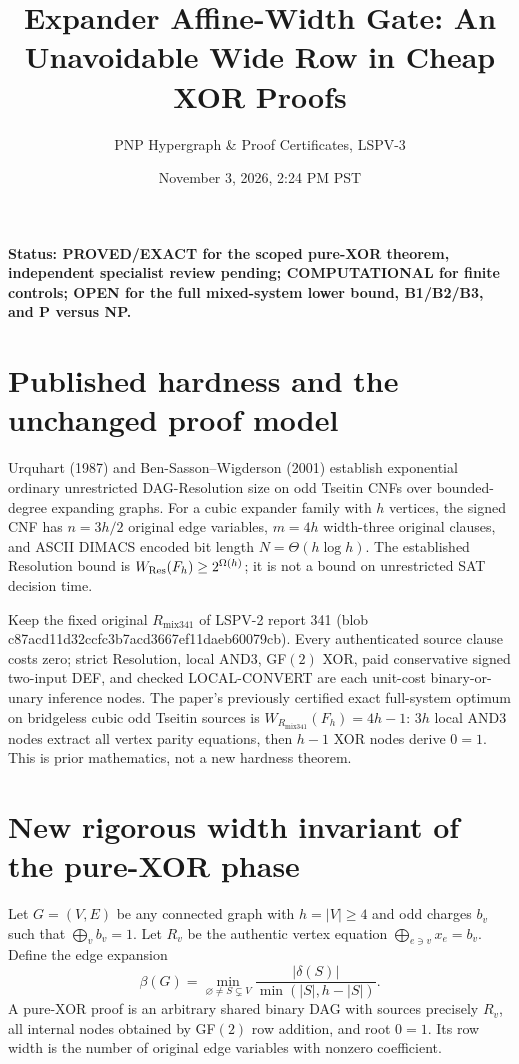 \documentclass[11pt]{article}
\title{Expander Affine-Width Gate: An Unavoidable Wide Row in Cheap XOR Proofs}
\author{PNP Hypergraph \& Proof Certificates, LSPV-3}
\date{November 3, 2026, 2:24 PM PST}
\begin{document}
\maketitle
\noindent\textbf{Status: PROVED/EXACT for the scoped pure-XOR theorem, independent specialist review pending; COMPUTATIONAL for finite controls; OPEN for the full mixed-system lower bound, B1/B2/B3, and P versus NP.}

\section*{Published hardness and the unchanged proof model}
Urquhart (1987) and Ben-Sasson--Wigderson (2001) establish exponential ordinary unrestricted DAG-Resolution size on odd Tseitin CNFs over bounded-degree expanding graphs. For a cubic expander family with $h$ vertices, the signed CNF has $n=3h/2$ original edge variables, $m=4h$ width-three original clauses, and ASCII DIMACS encoded bit length $N=\Theta(h\log h)$. The established Resolution bound is $W_{\rm Res}(F_h)\ge 2^{\Omega(h)}$; it is not a bound on unrestricted SAT decision time.

Keep the fixed original $R_{\mathrm{mix341}}$ of LSPV-2 report 341 (blob c87acd11d32ccfc3b7acd3667ef11daeb60079cb). Every authenticated source clause costs zero; strict Resolution, local AND3, GF$(2)$ XOR, paid conservative signed two-input DEF, and checked LOCAL-CONVERT are each unit-cost binary-or-unary inference nodes. The paper's previously certified exact full-system optimum on bridgeless cubic odd Tseitin sources is $W_{R_{\mathrm{mix341}}}(F_h)=4h-1$: $3h$ local AND3 nodes extract all vertex parity equations, then $h-1$ XOR nodes derive $0=1$. This is prior mathematics, not a new hardness theorem.

\section*{New rigorous width invariant of the pure-XOR phase}
Let $G=(V,E)$ be any connected graph with $h=|V|\ge4$ and odd charges $b_v$ such that $\bigoplus_v b_v=1$. Let $R_v$ be the authentic vertex equation $\bigoplus_{e\ni v}x_e=b_v$. Define the edge expansion
\[
\beta(G)=\min_{\varnothing\ne S\subsetneq V}
\frac{|\delta(S)|}{\min(|S|,h-|S|)} .
\]
A pure-XOR proof is an arbitrary shared binary DAG with sources precisely $R_v$, all internal nodes obtained by GF$(2)$ row addition, and root $0=1$. Its row width is the number of original edge variables with nonzero coefficient.
\end{document}
